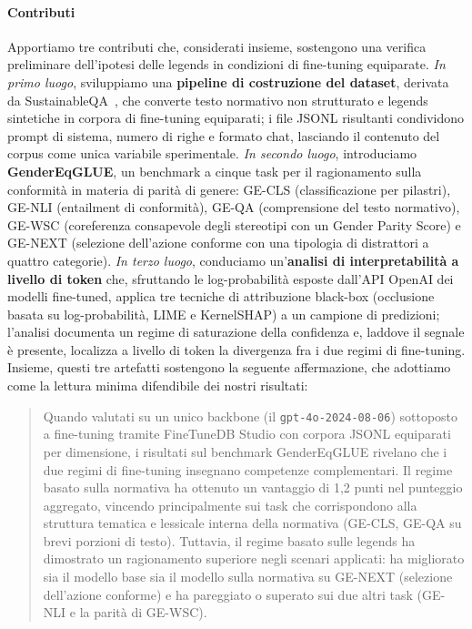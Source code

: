 \documentclass[pdflatex, sn-apa]{sn-jnl}%
\theoremstyle{thmstyleone}%
\theoremstyle{thmstyletwo}%
\theoremstyle{thmstylethree}%
\begin{document}
\paragraph{Contributi}
Apportiamo tre contributi che, considerati insieme, sostengono una verifica
preliminare dell'ipotesi delle legends in condizioni di fine-tuning equiparate.
\emph{In primo luogo}, sviluppiamo una \textbf{pipeline di costruzione del
dataset}, derivata da SustainableQA~\citep{wattenberg2025sustainableqa}, che
converte testo normativo non strutturato e legends sintetiche in corpora di
fine-tuning equiparati; i file JSONL risultanti condividono prompt di sistema,
numero di righe e formato chat, lasciando il contenuto del corpus come unica
variabile sperimentale. \emph{In secondo luogo}, introduciamo
\textbf{GenderEqGLUE}, un benchmark a cinque task per il ragionamento sulla
conformità in materia di parità di genere: GE-CLS (classificazione per pilastri),
GE-NLI (entailment di conformità), GE-QA (comprensione del testo normativo),
GE-WSC (coreferenza consapevole degli stereotipi con un Gender Parity Score) e
GE-NEXT (selezione dell'azione conforme con una tipologia di distrattori a quattro
categorie). \emph{In terzo luogo}, conduciamo un'\textbf{analisi di
interpretabilità a livello di token} che, sfruttando le log-probabilità esposte
dall'API OpenAI dei modelli fine-tuned, applica tre tecniche di attribuzione
black-box (occlusione basata su log-probabilità, LIME e KernelSHAP) a un campione
di predizioni; l'analisi documenta un regime di saturazione della confidenza e,
laddove il segnale è presente, localizza a livello di token la divergenza fra i
due regimi di fine-tuning.
Insieme, questi tre artefatti sostengono la seguente affermazione, che adottiamo
come la lettura minima difendibile dei nostri risultati:

\begin{quote}
Quando valutati su un unico backbone (il \texttt{gpt-4o-2024-08-06}) sottoposto a
fine-tuning tramite FineTuneDB Studio con corpora JSONL equiparati per
dimensione, i risultati sul benchmark GenderEqGLUE rivelano che i due regimi di
fine-tuning insegnano competenze complementari. Il regime basato sulla normativa
ha ottenuto un vantaggio di 1,2 punti nel punteggio aggregato, vincendo
principalmente sui task che corrispondono alla struttura tematica e lessicale
interna della normativa (GE-CLS, GE-QA su brevi porzioni di testo). Tuttavia, il
regime basato sulle legends ha dimostrato un ragionamento superiore negli scenari
applicati: ha migliorato sia il modello base sia il modello sulla normativa su
GE-NEXT (selezione dell'azione conforme) e ha pareggiato o superato sui due altri
task (GE-NLI e la parità di GE-WSC).
\end{quote}
 
\end{document}
